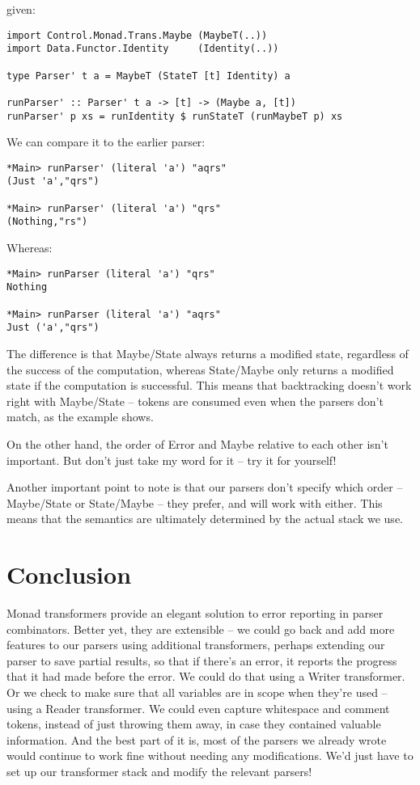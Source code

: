 \documentclass{tmr}
\begin{document}
given:
\begin{verbatim}
import Control.Monad.Trans.Maybe (MaybeT(..))
import Data.Functor.Identity     (Identity(..))

type Parser' t a = MaybeT (StateT [t] Identity) a

runParser' :: Parser' t a -> [t] -> (Maybe a, [t])
runParser' p xs = runIdentity $ runStateT (runMaybeT p) xs
\end{verbatim}

We can compare it to the earlier parser:
\begin{verbatim}
*Main> runParser' (literal 'a') "aqrs"
(Just 'a',"qrs")

*Main> runParser' (literal 'a') "qrs"
(Nothing,"rs")
\end{verbatim}
Whereas:
\begin{verbatim}
*Main> runParser (literal 'a') "qrs"
Nothing

*Main> runParser (literal 'a') "aqrs"
Just ('a',"qrs")
\end{verbatim}

The difference is that Maybe/State always returns a modified state, regardless
of the success of the computation, whereas State/Maybe only returns a modified
state if the computation is successful.  This means that backtracking doesn't
work right with Maybe/State -- tokens are consumed even when the parsers
don't match, as the example shows.

On the other hand, the order of Error and Maybe relative to each other isn't 
important.  But don't just take my word for it -- try it for yourself!

Another important point to note is that our parsers don't specify
which order -- Maybe/State or State/Maybe -- they prefer, and will 
work with either.  This means that the semantics are ultimately determined by 
the actual stack we use.




\section{Conclusion}
Monad transformers provide an elegant solution to error reporting in parser
combinators.  Better yet, they are extensible -- we could go back and add more
features to our parsers using additional transformers, perhaps extending our
parser to save partial results, so that if there's an error, it reports the
progress that it had made before the error.  We could do that using a Writer
transformer.  Or we check to make sure that all variables are in scope when
they're used -- using a Reader transformer.  We could even capture whitespace
and comment tokens, instead of just throwing them away, in case they contained
valuable information.  And the best part of it is, most of the parsers we already
wrote would continue to work fine without needing any modifications.  We'd just
have to set up our transformer stack and modify the relevant parsers! 





\end{document}
